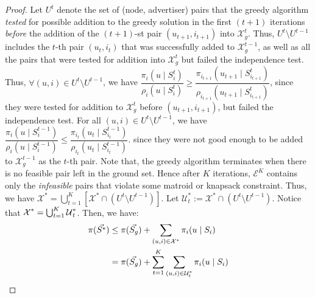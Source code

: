 \begin{proof}
Let $U^{t}$ denote the set of (node, advertiser) pairs that the greedy algorithm \emph{tested} for possible addition to the greedy solution in the first $(t+1)$ iterations \emph{before} the addition of the $(t+1)$-st pair $(u_{t+1}, i_{t+1})$ into $\mathcal{X}_g^{t}$. Thus, $U^t \setminus U^{t-1}$ includes the $t$-th pair $(u_t, i_t)$ that was successfully added to $\mathcal{X}_g^{t-1}$, as well as all the pairs that were tested for addition into $\mathcal{X}_g^{t}$ but failed the independence test. Thus, $\forall (u,i) \in U^t \setminus U^{t-1}$, we have
$\dfrac{\pi_{i}(u \mid S_{i}^{t})}{\rho_{i}(u \mid S_{i}^{t})} \ge \dfrac{\pi_{i_{t+1}}(u_{t+1} \mid S_{i_{t+1}}^{t})}{\rho_{i_{t+1}}(u_{t+1} \mid S_{i_{t+1}}^{t})}$, since they were tested for addition to $\mathcal{X}^t_g$ before $(u_{t+1}, i_{t+1})$, but failed the independence test. For all $(u,i) \in U^t \setminus U^{t-1}$, we have $\dfrac{\pi_{i}(u \mid S_{i}^{t-1})}{\rho_{i}(u \mid S_{i}^{t-1})} \le \dfrac{\pi_{i_t}(u_t \mid S_{i_t}^{t-1})}{\rho_{i_t}(u_t \mid S_{i_t}^{t-1})}$.
since they were not good enough to be added to $\mathcal{X}_g^{t-1}$ as the $t$-th pair. Note that, the greedy algorithm terminates when there is no feasible pair left in the ground set. Hence after $K$ iterations, $\mathcal{E}^{K}$ contains only the \emph{infeasible} pairs that violate some matroid or knapsack constraint. Thus, we have $\mathcal{X}^* = \bigcup_{t=1}^{K} [\mathcal{X}^* \cap (U^t \setminus U^{t-1}) ]$. Let $ \mathcal{U}^*_t := \mathcal{X}^* \cap (U^t \setminus U^{t-1})$. Notice that $\mbox{$\mathcal{X}$}^* = \bigcup_{t=1}^K \mbox{$\mathcal{U}$}_t^*$. Then, we have:
\begin{align*}
\pi(\vec{S^*}) &\le \pi(\vecalloc)  + \sum_{(u,i) \in \mathcal{X}^*} \pi_i(u \mid S_i) \\
 &= \pi(\vecalloc)  + \sum_{t=1}^{K} \sum_{(u,i) \in \mathcal{U}^*_t} \pi_i(u \mid S_i) \\

\end{align*}
\end{proof}
